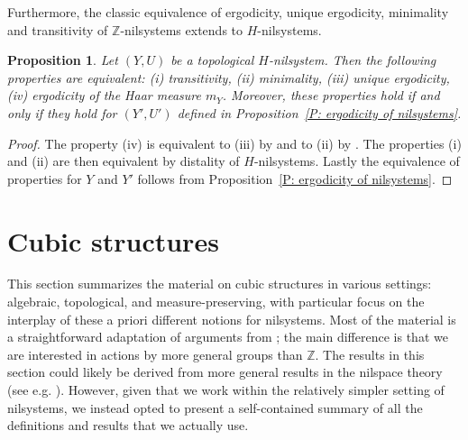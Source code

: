 \documentclass[11pt]{amsart}
\newtheorem{proposition}[lemma]{Proposition}
\theoremstyle{definition}
\newcommand{\Z}{{\mathbb Z}}
\newcommand{\1}{{\mathbf{1}}}
\begin{document}
Furthermore, the classic equivalence of ergodicity, unique ergodicity, minimality and transitivity of $\Z$-nilsystems extends to $H$-nilsystems.
\begin{proposition}\label{P: equivalence of ergodicity on nil}
    Let $(Y, U)$ be a topological $H$-nilsystem. Then the following properties are equivalent: (i) transitivity, (ii) minimality, (iii) unique ergodicity, (iv) ergodicity of the Haar measure $m_Y$. Moreover, these properties hold if and only if they hold for $(Y', U')$ defined in Proposition~\ref{P: ergodicity of nilsystems}.
\end{proposition}
\begin{proof}
    The property (iv) is equivalent to (iii) by \cite[Theorem~2.19]{L05b} and to (ii) by \cite[Corollary 2.20]{L05b}. The properties (i) and (ii) are then equivalent by distality of $H$-nilsystems. Lastly the equivalence of properties for $Y$ and $Y'$ follows from Proposition~\ref{P: ergodicity of nilsystems}.
\end{proof}



\section{Cubic structures}\label{A: cubes}
This section summarizes the material on cubic structures in various settings: algebraic, topological, and measure-preserving, with particular focus on the interplay of these a priori different notions for nilsystems. Most of the material is a straightforward adaptation of arguments from \cite{HK18}; the main difference is that we are interested in actions by more general groups than $\Z$. The results in this section could likely be derived from more general results in the nilspace theory (see e.g. \cite{Can17a, Can17b,CGSS20}). However, given that we work within the relatively simpler setting of nilsystems, we instead opted to present a self-contained summary of all the definitions and results that we actually use.
\end{document}
